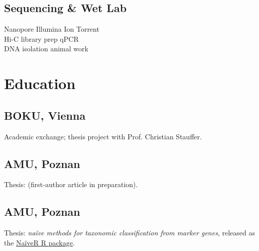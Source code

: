 \documentclass[]{deedy-resume-openfont}
\begin{document}
\begin{minipage}[t]{0.33\textwidth}
\subsection{Sequencing \& Wet Lab}
Nanopore \textbullet{} Illumina \textbullet{} Ion Torrent \\
Hi-C library prep \textbullet{} qPCR \\
DNA isolation \textbullet{} animal work
\sectionsep

\section{Education}

\subsection{BOKU, Vienna}
\location{\WhenBoku{}}
{\footnotesize Academic exchange; thesis project with Prof. Christian Stauffer.}\\
\sectionsep

\subsection{AMU, Poznan}
\location{\WhenAmuMsc{}}
{\footnotesize Thesis: \ThesisMsc{} (first-author article in preparation).}\\
\sectionsep

\subsection{AMU, Poznan}
\location{\WhenAmuBsc{}}
{\footnotesize Thesis: \textit{naïve methods for taxonomic classification from marker genes}, released as the \href{\MyNaiveRURL{}}{NaïveR R package}.}\\
\sectionsep

\end{minipage}
\hfill
\end{document}
